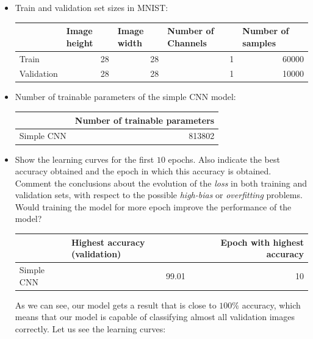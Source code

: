 \documentclass[a4paper]{article}
\begin{document}
\begin{itemize}
  \item Train and validation set sizes in MNIST:
        \begin{table}[H]
          \centering
          \begin{tabular}{l|rrrr}
                       & \multicolumn{1}{l}{Image height} & \multicolumn{1}{l}{Image width} & \multicolumn{1}{l}{Number of Channels} & \multicolumn{1}{l}{Number of samples} \\ \hline
            Train      & 28                               & 28                              & 1                                      & 60000                                 \\
            Validation & 28                               & 28                              & 1                                      & 10000
          \end{tabular}
        \end{table}
  \item Number of trainable parameters of the simple CNN model:
        \begin{table}[H]
          \centering
          \begin{tabular}{l|r}
                       & \multicolumn{1}{l}{Number of trainable parameters} \\  \hline
            Simple CNN & 813802
          \end{tabular}
        \end{table}
  \item Show the learning curves for the first \(10\) epochs. Also indicate the best accuracy obtained and the epoch in which this accuracy is obtained. Comment the conclusions about the evolution of the \emph{loss} in both training and validation sets, with respect to the possible \emph{high-bias} or \emph{overfitting} problems. Would training the model for more epoch improve the performance of the model?
        \begin{table}[H]
          \centering
          \begin{tabular}{l|rr}
                       & \multicolumn{1}{l}{Highest accuracy (validation)} & Epoch with highest accuracy \\ \hline
            Simple CNN & 99.01                                             & 10
          \end{tabular}
        \end{table}
        As we can see, our model gets a result that is close to $100\%$ accuracy, which means that our model is capable of classifying almost all validation images correctly. Let us see the learning curves:

\end{itemize}
\end{document}
